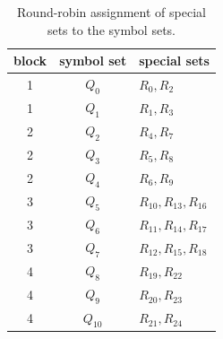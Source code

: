 \begin{table}[!ht]
\centering
\small
\setlength{\tabcolsep}{5.0pt}
\begin{tabular}{|c|c|l|}
\hline
block & symbol set & special sets \\ \hline
1 & $Q_{0}$ & $R_{0},R_{2}$ \\ \hline
1 & $Q_{1}$ & $R_{1},R_{3}$ \\ \hline
2 & $Q_{2}$ & $R_{4},R_{7}$ \\ \hline
2 & $Q_{3}$ & $R_{5},R_{8}$ \\ \hline
2 & $Q_{4}$ & $R_{6},R_{9}$ \\ \hline
3 & $Q_{5}$ & $R_{10},R_{13},R_{16}$ \\ \hline
3 & $Q_{6}$ & $R_{11},R_{14},R_{17}$ \\ \hline
3 & $Q_{7}$ & $R_{12},R_{15},R_{18}$ \\ \hline
4 & $Q_{8}$ & $R_{19},R_{22}$ \\ \hline
4 & $Q_{9}$ & $R_{20},R_{23}$ \\ \hline
4 & $Q_{10}$ & $R_{21},R_{24}$ \\ \hline
\end{tabular}
\caption{Round-robin assignment of special sets to the symbol sets.}
\label{table:dp-round-robin}
\end{table}



